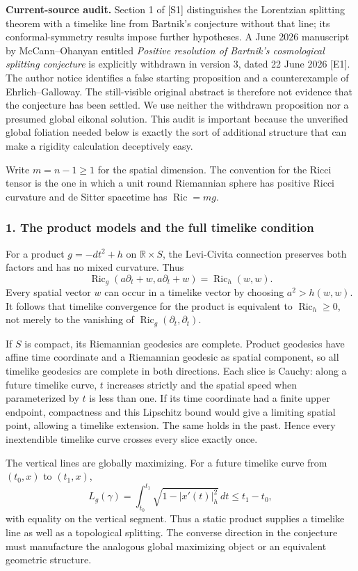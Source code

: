 \documentclass[11pt]{article}
\begin{document}
\textbf{Current-source audit.} Section 1 of [S1] distinguishes the Lorentzian splitting theorem with a timelike line from Bartnik's conjecture without that line; its conformal-symmetry results impose further hypotheses. A June 2026 manuscript by McCann--Ohanyan entitled \emph{Positive resolution of Bartnik's cosmological splitting conjecture} is explicitly withdrawn in version 3, dated 22 June 2026 [E1]. The author notice identifies a false starting proposition and a counterexample of Ehrlich--Galloway. The still-visible original abstract is therefore not evidence that the conjecture has been settled. We use neither the withdrawn proposition nor a presumed global eikonal solution. This audit is important because the unverified global foliation needed below is exactly the sort of additional structure that can make a rigidity calculation deceptively easy.

Write $m=n-1\ge1$ for the spatial dimension. The convention for the Ricci tensor is the one in which a unit round Riemannian sphere has positive Ricci curvature and de Sitter spacetime has $\operatorname{Ric}=m g$.

\subsubsection{1. The product models and the full timelike condition}
For a product $g=-dt^2+h$ on $\mathbb R\times S$, the Levi-Civita connection preserves both factors and has no mixed curvature. Thus
\[
 \operatorname{Ric}_g(a\partial_t+w,a\partial_t+w)
 =\operatorname{Ric}_h(w,w).                            \tag{1}
\]
Every spatial vector $w$ can occur in a timelike vector by choosing $a^2>h(w,w)$. It follows that timelike convergence for the product is equivalent to $\operatorname{Ric}_h\ge0$, not merely to the vanishing of $\operatorname{Ric}_g(\partial_t,\partial_t)$.

If $S$ is compact, its Riemannian geodesics are complete. Product geodesics have affine time coordinate and a Riemannian geodesic as spatial component, so all timelike geodesics are complete in both directions. Each slice is Cauchy: along a future timelike curve, $t$ increases strictly and the spatial speed when parameterized by $t$ is less than one. If its time coordinate had a finite upper endpoint, compactness and this Lipschitz bound would give a limiting spatial point, allowing a timelike extension. The same holds in the past. Hence every inextendible timelike curve crosses every slice exactly once.

The vertical lines are globally maximizing. For a future timelike curve from $(t_0,x)$ to $(t_1,x)$,
\[
 L_g(\gamma)=\int_{t_0}^{t_1}\sqrt{1-|x'(t)|_h^2}\,dt
 \le t_1-t_0,
\]
with equality on the vertical segment. Thus a static product supplies a timelike line as well as a topological splitting. The converse direction in the conjecture must manufacture the analogous global maximizing object or an equivalent geometric structure.
\end{document}
